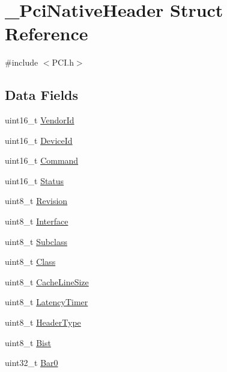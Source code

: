 \hypertarget{struct__PciNativeHeader}{}\section{\+\_\+\+Pci\+Native\+Header Struct Reference}
\label{struct__PciNativeHeader}


{\ttfamily \#include $<$P\+C\+I.\+h$>$}

\subsection*{Data Fields}
\begin{DoxyCompactItemize}
\item 
uint16\+\_\+t \hyperlink{struct__PciNativeHeader_acc809b557a84fbe99da19b442210e6a1}{Vendor\+Id}
\item 
uint16\+\_\+t \hyperlink{struct__PciNativeHeader_a4cb00b77b64768cc8754c3b5938a09ea}{Device\+Id}
\item 
uint16\+\_\+t \hyperlink{struct__PciNativeHeader_a81ce29fa9d9c0c10e6dd3694171a4c26}{Command}
\item 
uint16\+\_\+t \hyperlink{struct__PciNativeHeader_a8e4bcdfb2744454f91bae6ee68ce0a44}{Status}
\item 
uint8\+\_\+t \hyperlink{struct__PciNativeHeader_a655b55f4aec8aa162568754a43e61117}{Revision}
\item 
uint8\+\_\+t \hyperlink{struct__PciNativeHeader_ada9dcea6b70e8eb30bfc652af3e90cb1}{Interface}
\item 
uint8\+\_\+t \hyperlink{struct__PciNativeHeader_a988d996c402af2ac9a89b86d409815b5}{Subclass}
\item 
uint8\+\_\+t \hyperlink{struct__PciNativeHeader_a2feb2dca74bf9ff2af1e08ebbb310241}{Class}
\item 
uint8\+\_\+t \hyperlink{struct__PciNativeHeader_a2a524801b4961a6ef1ed8df9fd658621}{Cache\+Line\+Size}
\item 
uint8\+\_\+t \hyperlink{struct__PciNativeHeader_a730fa76240530058c4833de2b1fd6925}{Latency\+Timer}
\item 
uint8\+\_\+t \hyperlink{struct__PciNativeHeader_a3eadff3dde49511e8771e19769964e23}{Header\+Type}
\item 
uint8\+\_\+t \hyperlink{struct__PciNativeHeader_a57e75ff47ecc5d366d176a20e4023931}{Bist}
\item 
uint32\+\_\+t \hyperlink{struct__PciNativeHeader_a5ea1ceacaf1539a1f43d418cb35d5ae0}{Bar0}
\item 

\end{DoxyCompactItemize}
